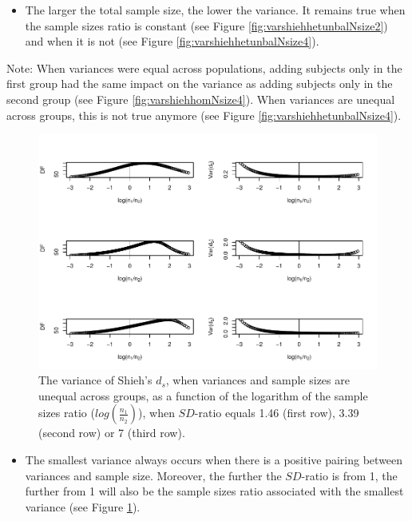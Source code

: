 \documentclass[
  english,
  man,mask]{apa6}
\providecommand{\tightlist}{%
  \setlength{\itemsep}{0pt}\setlength{\parskip}{0pt}}
\begin{document}
\begin{itemize}
\tightlist
\item
  The larger the total sample size, the lower the variance. It remains true when the sample sizes ratio is constant (see Figure \ref{fig:varshiehhetunbalNsize2}) and when it is not (see Figure \ref{fig:varshiehhetunbalNsize4}).
\end{itemize}

Note: When variances were equal across populations, adding subjects only in the first group had the same impact on the variance as adding subjects only in the second group (see Figure \ref{fig:varshiehhomNsize4}). When variances are unequal across groups, this is not true anymore (see Figure \ref{fig:varshiehhetunbalNsize4}).

\begin{figure}
\centering
\includegraphics{Theoretical-Variance-of-all-estimators-as-a-function-of-population-parameters_files/figure-latex/varshiehhetunbaldfandvar-1.pdf}
\caption{\label{fig:varshiehhetunbaldfandvar}The variance of Shieh's \(d_s\), when variances and sample sizes are unequal across groups, as a function of the logarithm of the sample sizes ratio (\(log \left( \frac{n_1}{n_2} \right)\)), when \(SD\)-ratio equals 1.46 (first row), 3.39 (second row) or 7 (third row).}
\end{figure}

\begin{itemize}
\tightlist
\item
  The smallest variance always occurs when there is a positive pairing between variances and sample size. Moreover, the further the \(SD\)-ratio is from 1, the further from 1 will also be the sample sizes ratio associated with the smallest variance (see Figure \ref{fig:varshiehhetunbaldfandvar}).
\end{itemize}
\end{document}
